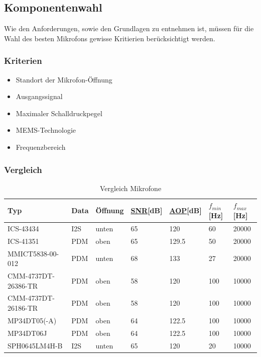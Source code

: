 \documentclass[12pt]{article}
\begin{document}
	\subsection{Komponentenwahl}
	Wie den Anforderungen, sowie den Grundlagen zu entnehmen ist, müssen für die Wahl des besten Mikrofons gewisse Kritierien berücksichtigt werden.
	\subsubsection{Kriterien}
	\begin{itemize}
		\item Standort der Mikrofon-Öffnung
		\item Ausgangssignal
		\item Maximaler Schalldruckpegel
		\item MEMS-Technologie
		\item Frequenzbereich
	\end{itemize}
	\subsubsection{Vergleich}
	\begin{table}[H]
		\centering
		\begin{tabular}{|p{}|l|l|l|l|l|l|}
			\hline
			\textbf{Typ} & \textbf{Data} & \textbf{Öffnung} & \textbf{\hyperref[SNR]{SNR}[dB]} & \textbf{\hyperref[AOP]{AOP}[dB]} & \textbf{$f_{min}$[Hz]} & \textbf{$f_{max}$[Hz]} \\\hline
	ICS-43434 & I2S & unten & 65 & 120 & 60 & 20000 \\ \hline
	ICS-41351 & PDM & oben & 65 & 129.5 & 50 & 20000 \\ \hline
	MMICT5838-00-012 & PDM & unten & 68 & 133 & 27 & 20000 \\ \hline
	CMM-4737DT-26386-TR & PDM & oben & 58 & 120 & 100 & 10000 \\ \hline
	CMM-4737DT-26186-TR & PDM & oben & 58 & 120 & 100 & 10000 \\ \hline
	MP34DT05(-A) & PDM & oben & 64 & 122.5 & 100 & 10000 \\ \hline
	MP34DT06J & PDM & oben & 64 & 122.5 & 100 & 10000 \\ \hline
	SPH0645LM4H-B & I2S & unten & 65 & 120 & 20 & 10000 \\ \hline
	\end{tabular}
	\caption{Vergleich Mikrofone}
	\label{table:vergleich-mikrofone}
\end{table}
\end{document}
